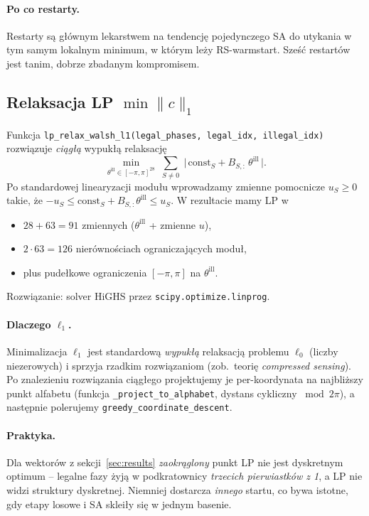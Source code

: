 \documentclass[11pt,a4paper]{article}
\newcommand{\1}{\mathbf{1}}
\newcommand{\code}[1]{\texttt{#1}}
\begin{document}
\paragraph{Po co restarty.} Restarty są głównym lekarstwem na
tendencję pojedynczego SA do utykania w tym samym lokalnym minimum,
w którym leży RS-warmstart. Sześć restartów jest tanim, dobrze
zbadanym kompromisem.

\subsection{Relaksacja LP $\min \|c\|_{1}$}
\label{sec:lp}

Funkcja \code{lp\_relax\_walsh\_l1(legal\_phases, legal\_idx,
illegal\_idx)} rozwiązuje \emph{ciągłą} wypukłą relaksację
\begin{equation}
\label{eq:lp}
\min_{\theta^{\mathrm{ill}}\in[-\pi,\pi]^{28}}\;
\sum_{S\neq 0}\;\bigl|\,\mathrm{const}_{S}+B_{S,:}\,\theta^{\mathrm{ill}}\,\bigr|.
\end{equation}
Po standardowej linearyzacji modułu wprowadzamy zmienne pomocnicze
$u_{S}\ge 0$ takie, że
$-u_{S}\le\mathrm{const}_{S}+B_{S,:}\theta^{\mathrm{ill}}\le u_{S}$.
W rezultacie mamy LP w
\begin{itemize}[leftmargin=*]
  \item $28+63=91$ zmiennych ($\theta^{\mathrm{ill}}$ + zmienne $u$),
  \item $2\cdot 63=126$ nierównościach ograniczających moduł,
  \item plus pudełkowe ograniczenia $[-\pi,\pi]$ na $\theta^{\mathrm{ill}}$.
\end{itemize}
Rozwiązanie: solver HiGHS przez \code{scipy.optimize.linprog}.

\paragraph{Dlaczego $\ell_{1}$.} Minimalizacja $\ell_{1}$ jest
standardową \emph{wypukłą} relaksacją problemu $\ell_{0}$ (liczby
niezerowych) i sprzyja rzadkim rozwiązaniom (zob.\ teorię
\emph{compressed sensing}). Po znalezieniu rozwiązania ciągłego
projektujemy je per-koordynata na najbliższy punkt alfabetu (funkcja
\code{\_project\_to\_alphabet}, dystans cykliczny
$\bmod 2\pi$), a następnie polerujemy \code{greedy\_coordinate\_descent}.

\paragraph{Praktyka.} Dla wektorów z sekcji~\ref{sec:results}
\emph{zaokrąglony} punkt LP nie jest dyskretnym optimum -- legalne fazy
żyją w podkratownicy \emph{trzecich pierwiastków z 1}, a LP nie widzi
struktury dyskretnej. Niemniej dostarcza \emph{innego} startu, co bywa
istotne, gdy etapy losowe i SA skleiły się w jednym basenie.
\end{document}
